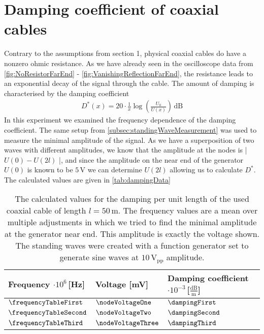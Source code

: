 \documentclass[a4paper,10pt,twocolumn]{article}
\begin{document}
    \section{Damping coefficient of coaxial cables}\label{sec:dampingCoefficient}
    
    Contrary to the assumptions from section 1, physical coaxial cables do have a nonzero ohmic resistance.
    As we have already seen in the oscilloscope data from \autoref{fig:NoResistorFarEnd} - \autoref{fig:VanishingReflectionFarEnd}, the resistance leads to an exponential decay of the signal through the cable.
    The amount of damping is characterised by the damping coefficient
    \begin{align}
       D^*(x) = 20\cdot \frac{1}{x}\log(\frac{U_0}{U(x)})\,\text{dB} 
    \end{align}
    In this experiment we examined the frequency dependence of the damping coefficient.
    The same setup from \autoref{subsec:standingWaveMeasurement} was used to measure the minimal amplitude of the signal.
    As we have a superposition of two waves with different amplitudes, we know that the amplitude at the nodes is | $U(0) - U(2l)$ |, and since the amplitude on the near end of the generator $U(0)$ is known to be $5\,$V
    we can determine $U(2l)$ allowing us to calculate $D^*$.
    The calculated values are given in \autoref{tab:dampingData}
    \begin{table}
        \centering
        \fontsize{7pt}{8pt}\selectfont
        \begin{tabular*}{\linewidth}{@{\extracolsep{\fill}}lll}
    \hline  
    \hline
    \rule[-7pt]{0pt}{23pt}  Frequency $\cdot 10^6\,$[Hz]& Voltage [mV]& Damping coefficient $\cdot 10^{-3}\,$[$\frac{\text{dB}}{\text{m}}$]\\
    \hline
    \rule[-5pt]{0pt}{23pt}  $\frequencyTableFirst$ & $\nodeVoltageOne$& $ \dampingFirst $ \\
    \rule[-5pt]{0pt}{23pt}  $\frequencyTableSecond $ & $\nodeVoltageTwo$ & $ \dampingSecond $ \\
    \rule[-5pt]{0pt}{23pt}  $\frequencyTableThird$ &$\nodeVoltageThree$ & $\dampingThird $ \\
    \hline
    \hline   
        \end{tabular*}
        \caption[]{The calculated values for the damping per unit length of the used coaxial cable of length $l=50\,$m.
        The frequency values are a mean over multiple adjustments in which we tried to find the minimal amplitude at the generator near end.
        This amplitude is exactly the voltage shown.
        The standing waves were created with a function generator set to generate sine waves at $10\,\text{V}_{\text{pp}}$ amplitude.}
        \label{tab:dampingData}
    \end{table}
\end{document}
